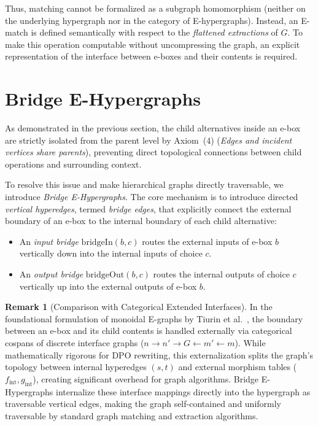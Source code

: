 \documentclass[11pt,a4paper]{article}
\theoremstyle{definition}
\newtheorem{remark}[definition]{Remark}
\theoremstyle{plain}
\begin{document}
Thus, matching cannot be formalized as a subgraph homomorphism (neither on the underlying hypergraph nor in the category of E-hypergraphs). Instead, an E-match is defined semantically with respect to the \emph{flattened extractions} of $G$. To make this operation computable without uncompressing the graph, an explicit representation of the interface between e-boxes and their contents is required.


\section{Bridge E-Hypergraphs}

As demonstrated in the previous section, the child alternatives inside an e-box are strictly isolated from the parent level by Axiom~(4) (\emph{Edges and incident vertices share parents}), preventing direct topological connections between child operations and surrounding context. 

To resolve this issue and make hierarchical graphs directly traversable, we introduce \emph{Bridge E-Hypergraphs}. The core mechanism is to introduce directed \emph{vertical hyperedges}, termed \emph{bridge edges}, that explicitly connect the external boundary of an e-box to the internal boundary of each child alternative:
\begin{itemize}
    \item An \emph{input bridge} $\mathrm{bridgeIn}(b, c)$ routes the external inputs of e-box $b$ vertically down into the internal inputs of choice $c$.
    \item An \emph{output bridge} $\mathrm{bridgeOut}(b, c)$ routes the internal outputs of choice $c$ vertically up into the external outputs of e-box $b$.
\end{itemize}

\begin{remark}[Comparison with Categorical Extended Interfaces]
In the foundational formulation of monoidal E-graphs by Tiurin et al.~\cite{tiurin2024equivalence}, the boundary between an e-box and its child contents is handled externally via categorical cospans of discrete interface graphs ($n \to n' \to G \leftarrow m' \leftarrow m$). While mathematically rigorous for DPO rewriting, this externalization splits the graph's topology between internal hyperedges $(s, t)$ and external morphism tables ($f_{\text{int}}, g_{\text{int}}$), creating significant overhead for graph algorithms. Bridge E-Hypergraphs internalize these interface mappings directly into the hypergraph as traversable vertical edges, making the graph self-contained and uniformly traversable by standard graph matching and extraction algorithms.
\end{remark}
\end{document}
